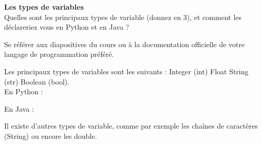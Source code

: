 \begin{Exercice}[5 minutes]  \textbf{Les types de variables}\\
    
    Quelles sont les principaux types de variable (donnez en 3), et comment les déclareriez vous en Python et en Java ? \\

    \begin{conseil}
    
        Se référer aux diapositives du cours ou à la documentation officielle de votre langage de programmation préféré.
        
    \end{conseil}
    \begin{solution}
    
        Les principaux types de variables sont les suivants : Integer (int) Float String (str) Boolean (bool).\\

		En Python :    
        
    	 
    	
    	
    	En Java : 
    	
    	 
    	
    	Il existe d'autres types de variable, comme par exemple les chaînes de caractères (String) ou encore les double.
 
    \end{solution}
\end{Exercice}


